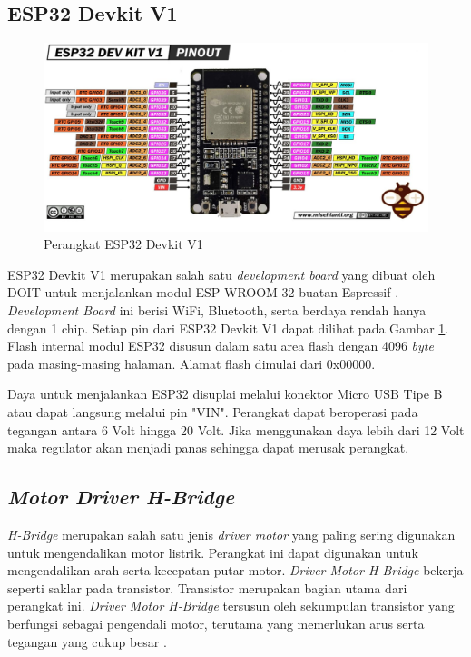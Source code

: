 \subsection{ESP32 Devkit V1}

\begin{figure} [ht] \centering
    \includegraphics[scale=0.39]{gambar/ESP32DevkitV1.jpg}
    \caption{Perangkat ESP32 Devkit V1}
    \label{fig:Perangkat ESP32}
\end{figure}

ESP32 Devkit V1 merupakan salah satu \emph{development board} yang dibuat oleh DOIT untuk menjalankan modul ESP-WROOM-32 buatan Espressif \parencite{SmartArduino_2022}. \emph{Development Board} ini berisi WiFi, Bluetooth, serta berdaya rendah hanya dengan 1 chip. Setiap pin dari ESP32 Devkit V1 dapat dilihat pada Gambar \ref{fig:Perangkat ESP32}. Flash internal modul ESP32 disusun dalam satu area flash dengan 4096 \emph{byte} pada masing-masing halaman. Alamat flash dimulai dari 0x00000.

Daya untuk menjalankan ESP32 disuplai melalui konektor Micro USB Tipe B atau dapat langsung melalui pin "VIN". Perangkat dapat beroperasi pada tegangan antara 6 Volt hingga 20 Volt. Jika menggunakan daya lebih dari 12 Volt maka regulator akan menjadi panas sehingga dapat merusak perangkat.

\subsection{\emph{Motor Driver H-Bridge}}

\emph{H-Bridge} merupakan salah satu jenis \emph{driver motor} yang paling sering digunakan untuk mengendalikan motor listrik. Perangkat ini dapat digunakan untuk mengendalikan arah serta kecepatan putar motor. \emph{Driver Motor H-Bridge} bekerja seperti saklar pada transistor. Transistor merupakan bagian utama dari perangkat ini. \emph{Driver Motor H-Bridge} tersusun oleh sekumpulan transistor yang berfungsi sebagai pengendali motor, terutama yang memerlukan arus serta tegangan yang cukup besar \parencite{Muhammad_2018}.

